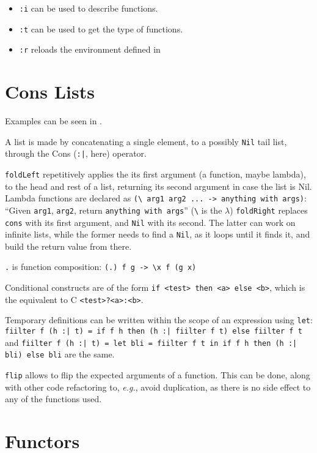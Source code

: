 \documentclass[a4paper]{article}
\newcommand{\latinlocution}[1]{\textit{#1}}
\newcommand{\eg}{\latinlocution{e.g.}}
\begin{document}
\begin{itemize}
  \item \verb_:i_ can be used to describe functions.
  \item \verb_:t_ can be used to get the type of functions.
  \item \verb_:r_ reloads the environment defined in 
\end{itemize}

\section{Cons Lists}

Examples can be seen in .

A list is made by concatenating a single element, to a possibly \verb_Nil_ tail
list, through the Cons (\verb_:|_, here) operator.

\verb_foldLeft_ repetitively applies the its first argument (a function, maybe
lambda), to the head and rest of a list, returning its second argument in case
the list is Nil. Lambda functions are declared as
%
\verb_(\ arg1 arg2 ... -> anything with args)_:
%
``Given \verb_arg1_, \verb_arg2_, return \verb_anything with args_'' (\verb_\_
is the $\lambda$) \verb_foldRight_ replaces \verb_cons_ with its first argument,
and \verb_Nil_ with its second. The latter can work on infinite lists, while the
former needs to find a \verb_Nil_, as it loops until it finds it, and build the
return value from there.

\verb_._ is function composition: \verb_(.) f g -> \x f (g x)_

Conditional constructs are of the form \verb_if <test> then <a> else <b>_, which
is the equivalent to C \verb_<test>?<a>:<b>_.

Temporary definitions can be written within the scope of an expression using
\verb_let_:
%
\verb_fiilter f (h :| t) = if f h then (h :| fiilter f t) else fiilter f t_ and
%
\verb_fiilter f (h :| t) = let bli = fiilter f t in if f h then (h :| bli) else bli_
are the same.

\verb_flip_ allows to flip the expected arguments of a function. This can be
done, along with other code refactoring to, \eg, avoid duplication, as there is
no side effect to any of the functions used.


\section{Functors}
\end{document}

